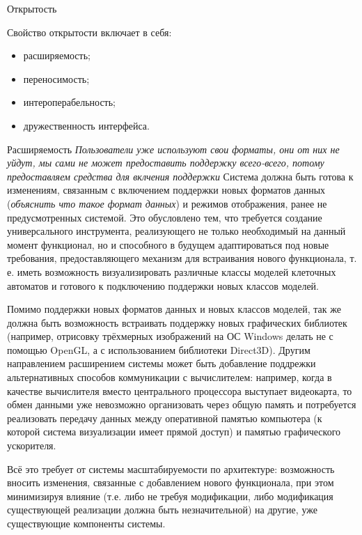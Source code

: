 \documentclass[a4paper,12pt]{extarticle}
\begin{document}
\begin{subsection}{Открытость}
    \label{sec:requirements-open}

    Свойство открытости включает в себя:
    \begin{itemize}
        \item расширяемость;
        \item переносимость;
        \item интероперабельность;
        \item дружественность интерфейса.
    \end{itemize}

    \begin{subsubsection}{Расширяемость}
        \textit{Пользователи уже используют свои форматы, они от них не уйдут, мы сами не может предоставить поддержку всего-всего, потому предоставляем средства для вклчения поддержки} Система должна быть готова к изменениям, связанным с включением поддержки новых форматов данных (\textit{объяснить что такое формат данных}) и режимов отображения, ранее не предусмотренных системой. Это обусловлено тем, что требуется создание универсального инструмента, реализующего не только необходимый на данный момент функционал, но и способного в будущем адаптироваться под новые требования, предоставляющего механизм для встраивания нового функционала, т. е. иметь возможность визуализировать различные классы моделей клеточных автоматов и готового к подключению поддержки новых классов моделей.
        
        Помимо поддержки новых форматов данных и новых классов моделей, так же должна быть возможность встраивать поддержку новых графических библиотек (например, отрисовку трёхмерных изображений на ОС Windows делать не с помощью OpenGL, а с использованием библиотеки Direct3D). Другим направлением расширением системы может быть добавление поддрежки альтернативных способов коммуникации с вычислителем: например, когда в качестве вычислителя вместо центрального процессора выступает видеокарта, то обмен данными уже невозможно организовать через общую память и потребуется реализовать передачу данных между оперативной памятью компьютера (к которой система визуализации имеет прямой доступ) и памятью графического ускорителя.
        
        Всё это требует от системы масштабируемости по архитектуре: возможность вносить изменения, связанные с добавлением нового функционала, при этом минимизируя влияние (т.е. либо не требуя модификации, либо модификация существующей реализации должна быть незначительной) на другие, уже существующие компоненты системы.
    \end{subsubsection}
        

\end{subsection}
\end{document}
